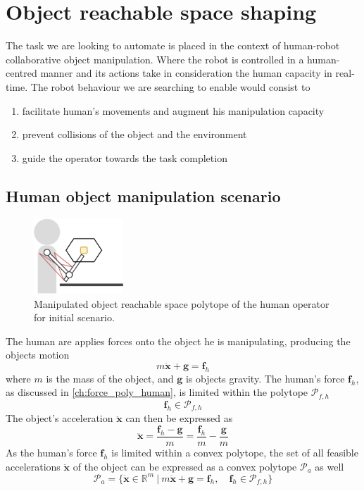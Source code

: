 \section{Object reachable space shaping}

The task we are looking to automate is placed in the context of human-robot collaborative object manipulation. Where the robot is controlled in a human-centred manner and its actions take in consideration the human capacity in real-time. The robot behaviour we are searching to enable would consist to
\begin{enumerate}
    \item facilitate human's movements and augment his manipulation capacity
    \item prevent collisions of the object and the environment
    \item guide the operator towards the task completion
\end{enumerate}

\subsection{Human object manipulation scenario}
\begin{figure}[htb!]
    \centering
    \includegraphics[width=0.3\textwidth]{Papers/lichie/g1.png}
    \caption{Manipulated object reachable space polytope of the human operator for initial scenario.}
    \label{fig:goal1}
\end{figure}


The human are applies forces onto the object he is manipulating, producing the objects motion
\begin{equation}
    m \ddot{\bm{x}} + \bm{g}= \bm{f}_h
\end{equation}
where $m$ is the mass of the object, and $\bm{g}$ is objects gravity. The human's force $\bm{f}_h$, as discussed in \ref{ch:force_poly_human}, is limited within the polytope $\mathcal{P}_{f,h}$
\begin{equation}
    \bm{f}_h \in \mathcal{P}_{f,h}
\end{equation}
The object's acceleration $\ddot{\bm{x}}$ can then be expressed as
\begin{equation}
    \ddot{\bm{x}} =  \frac{\bm{f}_h - \bm{g}}{m} = \frac{\bm{f}_h}{m}- \frac{\bm{g}}{m}
\end{equation}
As the human's force $\bm{f}_h$ is limited within a convex polytope, the set of all feasible accelerations $\ddot{\bm{x}}$ of the object can be expressed as a convex polytope $\mathcal{P}_a$ as well 
\begin{equation}
    \mathcal{P}_a = \{\ddot{\bm{x}} \in \mathbb{R}^m ~|~ m \ddot{\bm{x}} + \bm{g}= \bm{f}_h, \quad\bm{f}_h \in \mathcal{P}_{f,h} \}
\end{equation}


